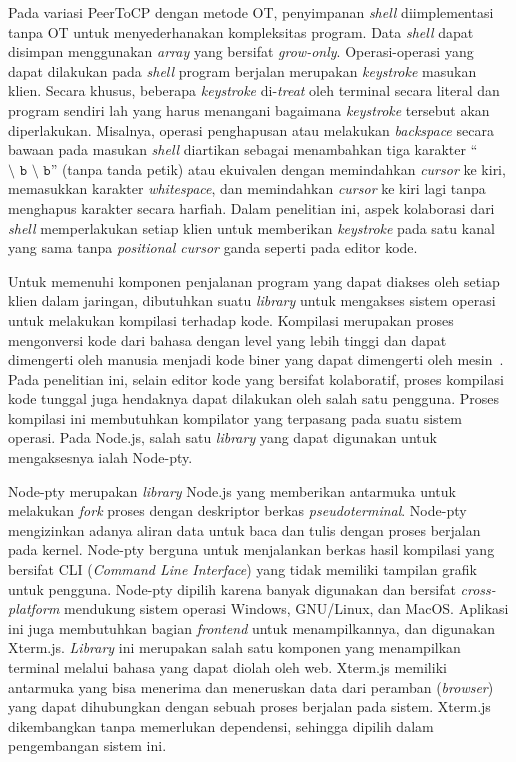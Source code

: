 Pada variasi PeerToCP dengan metode OT, penyimpanan \textit{shell} diimplementasi tanpa OT untuk menyederhanakan kompleksitas program. Data \textit{shell} dapat disimpan menggunakan \textit{array} yang bersifat \textit{grow-only}. Operasi-operasi yang dapat dilakukan pada \textit{shell} program berjalan merupakan \textit{keystroke} masukan klien. Secara khusus, beberapa \textit{keystroke} di-\textit{treat} oleh terminal secara literal dan program sendiri lah yang harus menangani bagaimana \textit{keystroke} tersebut akan diperlakukan. Misalnya, operasi penghapusan atau melakukan \textit{backspace} secara bawaan pada masukan \textit{shell} diartikan sebagai menambahkan tiga karakter ``$\texttt{\char`\\ b \char`\\ b}$'' (tanpa tanda petik) atau ekuivalen dengan memindahkan \textit{cursor} ke kiri, memasukkan karakter \textit{whitespace}, dan memindahkan \textit{cursor} ke kiri lagi tanpa menghapus karakter secara harfiah. Dalam penelitian ini, aspek kolaborasi dari \textit{shell} memperlakukan setiap klien untuk memberikan \textit{keystroke} pada satu kanal yang sama tanpa \textit{positional cursor} ganda seperti pada editor kode.

Untuk memenuhi komponen penjalanan program yang dapat diakses oleh setiap klien dalam jaringan, dibutuhkan suatu \textit{library} untuk mengakses sistem operasi untuk melakukan kompilasi terhadap kode. Kompilasi merupakan proses mengonversi kode dari bahasa dengan level yang lebih tinggi dan dapat dimengerti oleh manusia menjadi kode biner yang dapat dimengerti oleh mesin~\citep{aho1985compilers}. Pada penelitian ini, selain editor kode yang bersifat kolaboratif, proses kompilasi kode tunggal juga hendaknya dapat dilakukan oleh salah satu pengguna. Proses kompilasi ini membutuhkan kompilator yang terpasang pada suatu sistem operasi. Pada Node.js, salah satu \textit{library} yang dapat digunakan untuk mengaksesnya ialah Node-pty.

Node-pty merupakan \textit{library} Node.js yang memberikan antarmuka untuk melakukan \textit{fork} proses dengan deskriptor berkas \textit{pseudoterminal}. Node-pty mengizinkan adanya aliran data untuk baca dan tulis dengan proses berjalan pada kernel. Node-pty berguna untuk menjalankan berkas hasil kompilasi yang bersifat CLI (\textit{Command Line Interface}) yang tidak memiliki tampilan grafik untuk pengguna. Node-pty dipilih karena banyak digunakan dan bersifat \textit{cross-platform} mendukung sistem operasi Windows, GNU/Linux, dan MacOS. Aplikasi ini juga membutuhkan bagian \textit{frontend} untuk menampilkannya, dan digunakan Xterm.js. \textit{Library} ini merupakan salah satu komponen yang menampilkan terminal melalui bahasa yang dapat diolah oleh web. Xterm.js memiliki antarmuka yang bisa menerima dan meneruskan data dari peramban (\textit{browser}) yang dapat dihubungkan dengan sebuah proses berjalan pada sistem. Xterm.js dikembangkan tanpa memerlukan dependensi, sehingga dipilih dalam pengembangan sistem ini.



